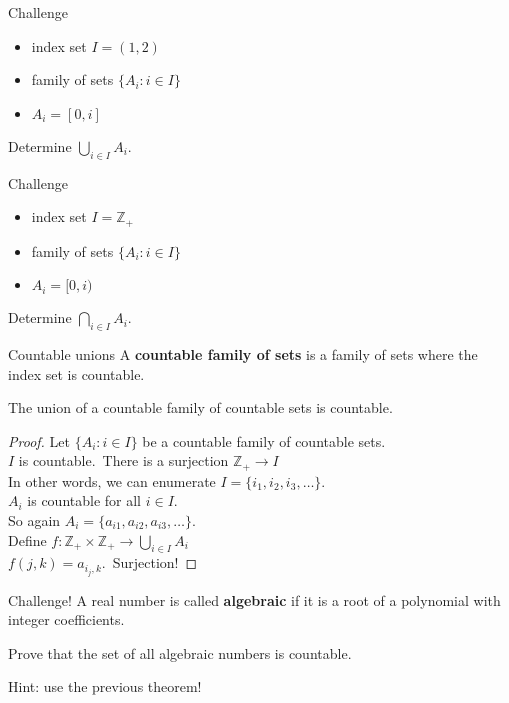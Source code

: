 \documentclass{beamer}
\begin{document}
\begin{frame}{Challenge}
\begin{itemize}
\item index set $I = (1,2)$
\item family of sets $\{A_i: i\in I\}$
\item $A_i = [0,i]$
\end{itemize}
\begin{prob}
Determine $\bigcup_{i\in I} A_i$.
\end{prob}
\end{frame}

\begin{frame}{Challenge}
\begin{itemize}
\item index set $I = \mathbb{Z}_+$
\item family of sets $\{A_i: i\in I\}$
\item $A_i = [0,i)$
\end{itemize}
\begin{prob}
Determine $\bigcap_{i\in I} A_i$.
\end{prob}
\end{frame}

\begin{frame}{Countable unions}
A \textbf{countable family of sets} is a family of sets where the index set is countable.
\pause
\begin{thm}
The union of a countable family of countable sets is countable.
\end{thm}
\pause
\begin{proof}
Let $\{A_i: i\in I\}$ be a countable family of countable sets.\\
\pause
$I$ is countable.\ \pause There is a surjection $\mathbb{Z}_+\rightarrow I$\\
\pause
In other words, we can enumerate $I = \{i_1,i_2,i_3,\dots\}$.\\
\pause
$A_i$ is countable for all $i\in I$.\\
\pause
So again $A_i = \{a_{i1},a_{i2},a_{i3},\dots\}$.\\
\pause
Define $f: \mathbb Z_+\times\mathbb Z_+\rightarrow \bigcup_{i\in I} A_i$\\
\pause
$f(j,k) = a_{i_j,k}$.\ \pause Surjection!
\end{proof}
\end{frame}

\begin{frame}{Challenge!}
A real number is called \textbf{algebraic} if it is a root of a polynomial with integer coefficients.
\pause
\begin{prob}
Prove that the set of all algebraic numbers is countable.
\end{prob}
\pause
Hint: use the previous theorem!
\end{frame}
\end{document}
